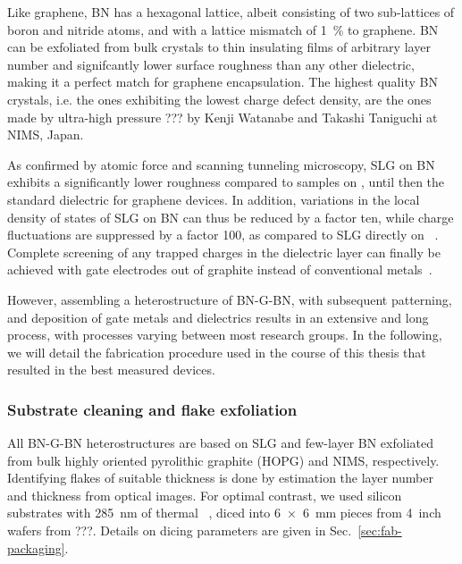 Like graphene, BN has a hexagonal lattice, albeit consisting of two sub-lattices of boron and nitride atoms, and with a lattice mismatch of \SI{1}{\percent} to graphene.
% 
BN can be exfoliated from bulk crystals to thin insulating films of arbitrary layer number and signifcantly lower surface roughness than any other dielectric, making it a perfect match for graphene encapsulation.
% 
The highest quality BN crystals, i.e. the ones exhibiting the lowest charge defect density, are the ones made by ultra-high pressure ??? by Kenji Watanabe and Takashi Taniguchi at NIMS, Japan.

As confirmed by atomic force and scanning tunneling microscopy, SLG on BN exhibits a significantly lower roughness compared to samples on , until then the standard dielectric for graphene devices.
% 
In addition, variations in the local density of states of SLG on BN can thus be reduced by a factor ten, while charge fluctuations are suppressed by a factor 100, as compared to SLG directly on ~\cite{xueScanningTunnellingMicroscopy2011,deckerLocalElectronicProperties2011}.
% 
Complete screening of any trapped charges in the dielectric layer can finally be achieved with gate electrodes out of graphite instead of conventional metals~\cite{ponomarenkoTunableMetalInsulator2011,ametNovelPhenomenaDriven2014}.

However, assembling a heterostructure of BN-G-BN, with subsequent patterning, and deposition of gate metals and dielectrics results in an extensive and long process, with processes varying between most research groups.
% 
In the following, we will detail the fabrication procedure used in the course of this thesis that resulted in the best measured devices.

\subsubsection{Substrate cleaning and flake exfoliation}

All BN-G-BN heterostructures are based on SLG and few-layer BN exfoliated from bulk highly oriented pyrolithic graphite (HOPG) and NIMS, respectively.
% 
Identifying flakes of suitable thickness is done by estimation the layer number and thickness from optical images.
% 
For optimal contrast, we used silicon substrates with \SI{285}{\nano\meter} of thermal ~\cite{blakeMakingGrapheneVisible2007}, diced into \SI{6x6}{\milli\meter} pieces from \SI{4}{inch} wafers from ???.
% 
Details on dicing parameters are given in Sec.~\ref{sec:fab-packaging}.

